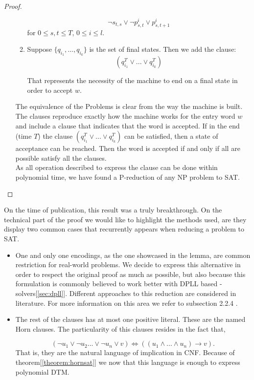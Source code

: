 \begin{proof}
\begin{itemize}
\begin{enumerate}
    $$\neg s_{t,s} \lor \neg p_{s,t}^i \lor  p_{s,t+1}^i  $$
    for $0 \le s,t \le T$, $0 \le i \le l$.
  \item Suppose $\{q_{i_1},...,q_{i_k}\}$ is the set of final states. Then we add the clause:
    $$ (q_{i_1}^T \lor ... \lor q_{i_k}^T)$$

    That represents the necessity of the machine to end on a final state in order to accept $w$.
    \end{enumerate}


    The equivalence of the Problems is clear from the way the machine is built. The clauses reproduce exactly how the machine works for the entry word $w$ and include a clause that indicates that the word is accepted. If in the end (time $T$) the clause $ (q_{i_1}^T \lor ... \lor q_{i_k}^T)$ can be satisfied, then a state of acceptance can be reached. Then the word is accepted if and only if all are possible satisfy all the clauses.\\

As all operation described to express the clause can be done within polynomial time, we have found a P-reduction of any NP problem to SAT.
  \end{itemize}
\end{proof}


On the time of publication, this result was a truly breakthrough. On the technical part of the proof we would like to highlight the methods used, are they display two common cases that recurrently appears when reducing a problem to SAT.

\begin{itemize}
\item One and only one encodings, as the one showcased in the lemma, are common restriction for real-world problems. We decide to express this alternative in order to respect the original proof as much as possible, but also because this formulation is commonly believed to work better with DPLL based - solvers[\ref{sec:dpll}]. Different approaches to this reduction are considered in literature. For more information on this area we refer to subsection 2.2.4 \cite{darwiche2009complete}.

\item The rest of the clauses has at most one positive literal. These are the named Horn clauses. The particularity of this clauses resides in the fact that,

  $$(\neg u_1 \lor \neg u_2 ... \lor \neg u_n \lor v) \iff ((u_1\land ... \land u_n) \to v).$$
  That is, they are the natural language of implication in CNF. Because of theorem[\ref{theorem:hornsat}] we now that this language is enough to express polynomial DTM.
\end{itemize}

